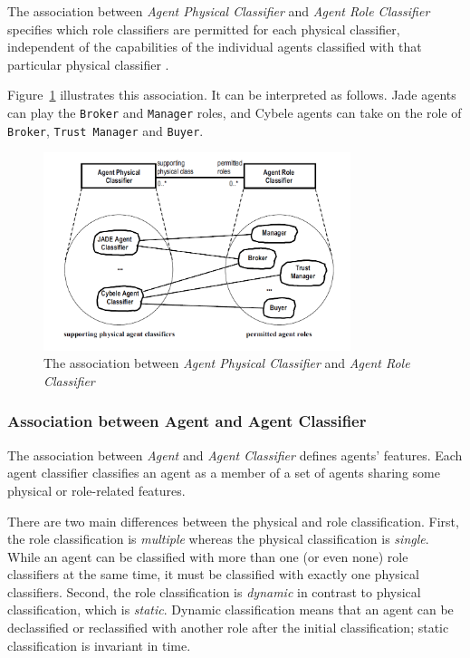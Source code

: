 The association between \textit{Agent Physical Classifier} and \textit{Agent Role Classifier} specifies which role classifiers are permitted for each physical classifier, independent of the capabilities of the individual agents classified with that particular physical classifier \cite{Odell05}.

Figure~\ref{figure:onp-physical-classifier-role-classifier-association} illustrates this association.
It can be interpreted as follows. Jade agents can play the \texttt{Broker} and \texttt{Manager} roles, and Cybele agents can take on the role of \texttt{Broker}, \texttt{Trust Manager} and \texttt{Buyer}.

\begin{figure}[ht]
	\centering
	\includegraphics[width=0.8\textwidth]{images/onp/physical-classifier-role-classifier-association.png}
	\caption{The association between \textit{Agent Physical Classifier} and \textit{Agent Role Classifier} \cite{Odell05}}
	\label{figure:onp-physical-classifier-role-classifier-association}
\end{figure}

\subsubsection*{Association between Agent and Agent Classifier}

The association between \textit{Agent} and \textit{Agent Classifier} defines agents' features.
Each agent classifier classifies an agent as a member of a set of agents sharing some physical or role-related features.

There are two main differences between the physical and role classification. First, the role classification is \textit{multiple} whereas the physical classification is \textit{single}.
While an agent can be classified with more than one (or even none) role classifiers at the same time, it must be classified with exactly one physical classifiers.
Second, the role classification is \textit{dynamic} in contrast to physical classification, which is \textit{static}.
Dynamic classification means that an agent can be declassified or reclassified with another role after the initial classification; static classification is invariant in time.

